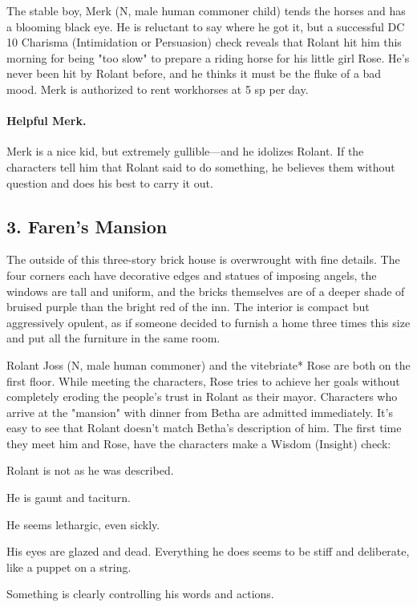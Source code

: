 \documentclass[10pt,a4paper,twoside,twocolumn,openany,bg=print,nodeprecatedcode]{dndbook}
\begin{document}
The stable boy, Merk (N, male human commoner child) tends the horses and has a blooming black eye. He is reluctant to say where he got it, but a successful DC 10 Charisma (Intimidation or Persuasion) check reveals that Rolant hit him this morning for being "too slow" to prepare a riding horse for his little girl Rose. He's never been hit by Rolant before, and he thinks it must be the fluke of a bad mood. Merk is authorized to rent workhorses at 5 sp per day.
\paragraph{Helpful Merk.}
Merk is a nice kid, but extremely gullible—and he idolizes Rolant. If the characters tell him that Rolant said to do something, he believes them without question and does his best to carry it out.
\subsection{3. Faren's Mansion}
\begin{DndReadAloud}{}
The outside of this three-story brick house is overwrought with fine details. The four corners each have decorative edges and statues of imposing angels, the windows are tall and uniform, and the bricks themselves are of a deeper shade of bruised purple than the bright red of the inn. The interior is compact but aggressively opulent, as if someone decided to furnish a home three times this size and put all the furniture in the same room.
\end{DndReadAloud}

Rolant Joss (N, male human commoner) and the vitebriate* Rose are both on the first floor. While meeting the characters, Rose tries to achieve her goals without completely eroding the people's trust in Rolant as their mayor.
Characters who arrive at the "mansion" with dinner from Betha are admitted immediately. It's easy to see that Rolant doesn't match Betha's description of him. The first time they meet him and Rose, have the characters make a Wisdom (Insight) check:

\begin{description}[nolistsep]
\item[0+:.]
Rolant is not as he was described.
\item[5+:.]
He is gaunt and taciturn.
\item[10+:.]
He seems lethargic, even sickly.
\item[15+:.]
His eyes are glazed and dead. Everything he does seems to be stiff and deliberate, like a puppet on a string.
\item[20+:.]
Something is clearly controlling his words and actions.
\end{description}
\end{document}
